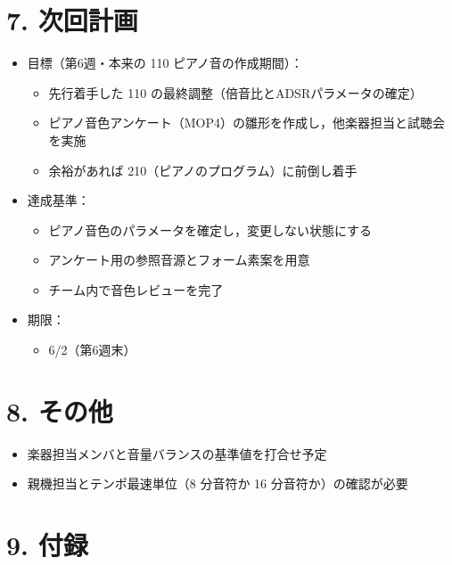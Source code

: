 \documentclass[a4paper,11pt]{ltjsarticle}
\providecommand{\％}{\%}
\begin{document}
\section{7. 次回計画}

\begin{itemize}
    \item 目標（第6週・本来の 110 ピアノ音の作成期間）：
    \begin{itemize}
        \item 先行着手した 110 の最終調整（倍音比とADSRパラメータの確定）
        \item ピアノ音色アンケート（MOP4）の雛形を作成し，他楽器担当と試聴会を実施
        \item 余裕があれば 210（ピアノのプログラム）に前倒し着手
    \end{itemize}
    \item 達成基準：
    \begin{itemize}
        \item ピアノ音色のパラメータを確定し，変更しない状態にする
        \item アンケート用の参照音源とフォーム素案を用意
        \item チーム内で音色レビューを完了
    \end{itemize}
    \item 期限：
    \begin{itemize}
        \item 6/2（第6週末）
    \end{itemize}
\end{itemize}

\section{8. その他}

\begin{itemize}
    \item 楽器担当メンバと音量バランスの基準値を打合せ予定
    \item 親機担当とテンポ最速単位（8 分音符か 16 分音符か）の確認が必要
\end{itemize}

\section{9. 付録}
\end{document}

